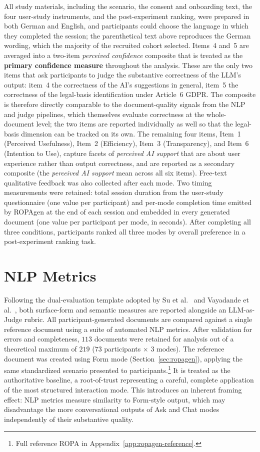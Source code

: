 All study materials, including the scenario, the consent and onboarding text, the four user-study instruments, and the post-experiment ranking, were prepared in both German and English, and participants could choose the language in which they completed the session; the parenthetical text above reproduces the German wording, which the majority of the recruited cohort selected. Items~4 and~5 are averaged into a two-item \emph{perceived confidence} composite that is treated as the \textbf{primary confidence measure} throughout the analysis. These are the only two items that ask participants to judge the substantive correctness of the LLM's output: item~4 the correctness of the AI's suggestions in general, item~5 the correctness of the legal-basis identification under Article~6 GDPR. The composite is therefore directly comparable to the document-quality signals from the NLP and judge pipelines, which themselves evaluate correctness at the whole-document level; the two items are reported individually as well so that the legal-basis dimension can be tracked on its own. The remaining four items, Item~1 (Perceived Usefulness), Item~2 (Efficiency), Item~3 (Transparency), and Item~6 (Intention to Use), capture facets of \emph{perceived AI support} that are about user experience rather than output correctness, and are reported as a secondary composite (the \emph{perceived AI support} mean across all six items). Free-text qualitative feedback was also collected after each mode. Two timing measurements were retained: total session duration from the user-study questionnaire (one value per participant) and per-mode completion time emitted by ROPAgen at the end of each session and embedded in every generated document (one value per participant per mode, in seconds). After completing all three conditions, participants ranked all three modes by overall preference in a post-experiment ranking task.

\section{NLP Metrics}

Following the dual-evaluation template adopted by Su et al.\ \cite{suJuDGEBenchmarkingJudgment2025} and Vayadande et al.\ \cite{vayadandeAIPoweredLegalDocumentation2024}, both surface-form and semantic measures are reported alongside an LLM-as-Judge rubric. All participant-generated documents are compared against a single reference document using a suite of automated NLP metrics. After validation for errors and completeness, $113$ documents were retained for analysis out of a theoretical maximum of $219$ ($73$ participants $\times$ $3$ modes). The reference document was created using Form mode (Section~\ref{sec:ropagen}), applying the same standardized scenario presented to participants.\footnote{Full reference ROPA in Appendix~\ref{app:ropagen-reference}.} It is treated as the authoritative baseline, a root-of-trust representing a careful, complete application of the most structured interaction mode. This introduces an inherent framing effect: NLP metrics measure similarity to Form-style output, which may disadvantage the more conversational outputs of Ask and Chat modes independently of their substantive quality.

